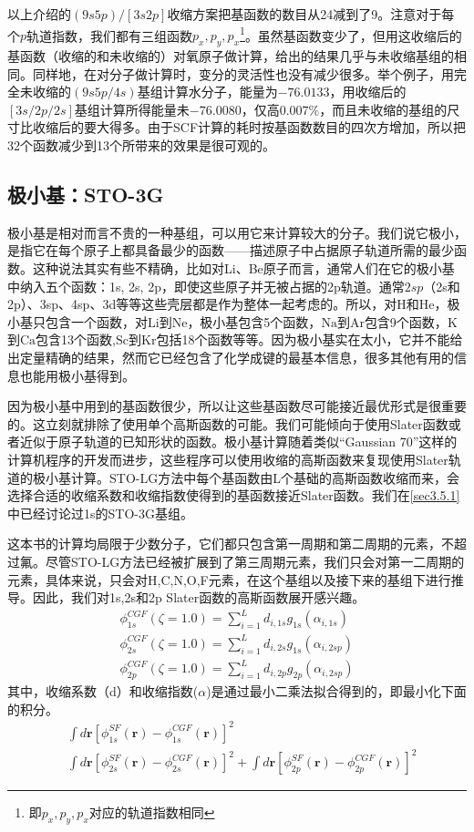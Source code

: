 以上介绍的$(9s5p)/[3s2p]$收缩方案把基函数的数目从24减到了9。注意对于每个$p$轨道指数，我们都有三组函数$p_x,p_y,p_x$\footnote{即$p_x,p_y,p_x$对应的轨道指数相同}。虽然基函数变少了，但用这收缩后的基函数（收缩的和未收缩的）对氧原子做计算，给出的结果几乎与未收缩基组的相同。同样地，在对分子做计算时，变分的灵活性也没有减少很多。举个例子，用完全未收缩的$(9s5p/4s)$基组计算水分子，能量为$-76.0133$，用收缩后的$[3s/2p/2s]$基组计算所得能量未$-76.0080$，仅高$0.007\%$，而且未收缩的基组的尺寸比收缩后的要大得多。由于SCF计算的耗时按基函数数目的四次方增加，所以把32个函数减少到13个所带来的效果是很可观的。

\subsection{极小基：STO-3G}
极小基是相对而言不贵的一种基组，可以用它来计算较大的分子。我们说它极小，是指它在每个原子上都具备最少的函数——描述原子中占据原子轨道所需的最少函数。这种说法其实有些不精确，比如对Li、Be原子而言，通常人们在它的极小基中纳入五个函数：1s, 2s, 2p，即使这些原子并无被占据的2p轨道。通常$2sp$（2s和2p）、3sp、4sp、3d等等这些壳层都是作为整体一起考虑的。所以，对$\mathrm{H}$和$\mathrm{He}$，极小基只包含一个函数，对$\mathrm{Li}$到$\mathrm{Ne}$，极小基包含5个函数，$\mathrm{Na}$到$\mathrm{Ar}$包含9个函数，$\mathrm{K}$到$\mathrm{Ca}$包含13个函数,$\mathrm{Sc}$到$\mathrm{Kr}$包括18个函数等等。因为极小基实在太小，它并不能给出定量精确的结果，然而它已经包含了化学成键的最基本信息，很多其他有用的信息也能用极小基得到。

因为极小基中用到的基函数很少，所以让这些基函数尽可能接近最优形式是很重要的。这立刻就排除了使用单个高斯函数的可能。我们可能倾向于使用Slater函数或者近似于原子轨道的已知形状的函数。极小基计算随着类似“Gaussian 70”这样的计算机程序的开发而进步，这些程序可以使用收缩的高斯函数来复现使用Slater轨道的极小基计算。STO-LG方法中每个基函数由L个基础的高斯函数收缩而来，会选择合适的收缩系数和收缩指数使得到的基函数接近Slater函数。我们在\ref{sec3.5.1}中已经讨论过1s的STO-3G基组。

这本书的计算均局限于少数分子，它们都只包含第一周期和第二周期的元素，不超过氟。尽管STO-LG方法已经被扩展到了第三周期元素，我们只会对第一二周期的元素，具体来说，只会对H,C,N,O,F元素，在这个基组以及接下来的基组下进行推导。因此，我们对1s,2s和2p Slater函数的高斯函数展开感兴趣。
\begin{align}
	\phi_{1s}^{CGF}(\zeta=1.0)=\sum_{i=1}^{L}d_{i,1s}g_{1s}(\alpha_{i,1s})\\
	\phi_{2s}^{CGF}(\zeta=1.0)=\sum_{i=1}^{L}d_{i,2s}g_{1s}(\alpha_{i,2sp})\\
	\phi_{2p}^{CGF}(\zeta=1.0)=\sum_{i=1}^{L}d_{i,2p}g_{2p}(\alpha_{i,2sp})
\end{align}
其中，收缩系数（d）和收缩指数($\alpha$)是通过最小二乘法拟合得到的，即最小化下面的积分。
\begin{align*}
	&\int d\mathbf{r}[\phi_{1s}^{SF}(\mathbf{r})-\phi_{1s}^{CGF}(\mathbf{r})]^2\\
	&\int d\mathbf{r}[\phi_{2s}^{SF}(\mathbf{r})-\phi_{2s}^{CGF}(\mathbf{r})]^2+	\int d\mathbf{r}[\phi_{2p}^{SF}(\mathbf{r})-\phi_{2p}^{CGF}(\mathbf{r})]^2	
\end{align*}

